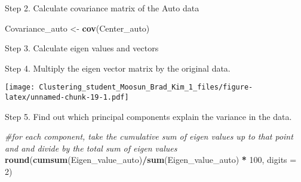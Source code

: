 \documentclass[11pt,]{article}
\newenvironment{Shaded}{\begin{snugshade}}{\end{snugshade}}
\newcommand{\CommentTok}[1]{\textcolor[rgb]{0.56,0.35,0.01}{\textit{#1}}}
\newcommand{\DataTypeTok}[1]{\textcolor[rgb]{0.13,0.29,0.53}{#1}}
\newcommand{\DecValTok}[1]{\textcolor[rgb]{0.00,0.00,0.81}{#1}}
\newcommand{\KeywordTok}[1]{\textcolor[rgb]{0.13,0.29,0.53}{\textbf{#1}}}
\newcommand{\NormalTok}[1]{#1}
\newcommand{\OperatorTok}[1]{\textcolor[rgb]{0.81,0.36,0.00}{\textbf{#1}}}
\newcommand{\StringTok}[1]{\textcolor[rgb]{0.31,0.60,0.02}{#1}}
\begin{document}
Step 2. Calculate covariance matrix of the Auto data

\begin{Shaded}
\begin{Highlighting}[]
\NormalTok{Covariance_auto <-}\StringTok{ }\KeywordTok{cov}\NormalTok{(Center_auto)}
\end{Highlighting}
\end{Shaded}

Step 3. Calculate eigen values and vectors

\begin{Shaded}
\end{Shaded}

Step 4. Multiply the eigen vector matrix by the original data.

\begin{Shaded}
\end{Shaded}

\texttt{[image: Clustering\_student\_Moosun\_Brad\_Kim\_1\_files/figure-latex/unnamed-chunk-19-1.pdf]}

Step 5. Find out which principal components explain the variance in the
data.

\begin{Shaded}
\begin{Highlighting}[]
\CommentTok{#for each component, take the cumulative sum of eigen values up to that point and and divide by the total sum of eigen values}
\KeywordTok{round}\NormalTok{(}\KeywordTok{cumsum}\NormalTok{(Eigen_value_auto)}\OperatorTok{/}\KeywordTok{sum}\NormalTok{(Eigen_value_auto) }\OperatorTok{*}\StringTok{ }\DecValTok{100}\NormalTok{, }\DataTypeTok{digits =} \DecValTok{2}\NormalTok{)}
\end{Highlighting}
\end{Shaded}
\end{document}
